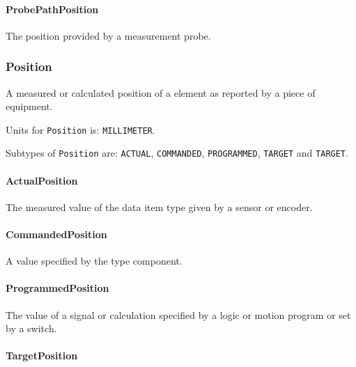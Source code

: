 \paragraph{ProbePathPosition}\mbox{}
\label{sec:ProbePathPosition}



The position provided by a measurement probe.


\subsubsection{Position}
\label{sec:Position}



A measured or calculated position of a  element as reported by a piece of equipment.


Units for \texttt{Position} is: \texttt{MILLIMETER}.


Subtypes of \texttt{Position} are: \texttt{ACTUAL}, \texttt{COMMANDED}, \texttt{PROGRAMMED}, \texttt{TARGET} and \texttt{TARGET}. 
\FloatBarrier

\paragraph{ActualPosition}\mbox{}
\label{sec:ActualPosition}



The measured value of the data item type given by a sensor or encoder.


\paragraph{CommandedPosition}\mbox{}
\label{sec:CommandedPosition}



A value specified by the  type component.


\paragraph{ProgrammedPosition}\mbox{}
\label{sec:ProgrammedPosition}



The value of a signal or calculation specified by a logic or motion program or set by a switch.


\paragraph{TargetPosition}\mbox{}
\label{sec:TargetPosition}




